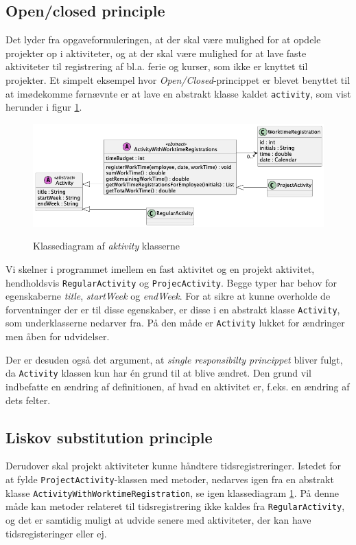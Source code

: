 \subsection{Open/closed principle} \label{sec:solid_o}
Det lyder fra opgaveformuleringen, at der skal være mulighed for at opdele projekter op i aktiviteter, og at der skal være mulighed for at lave faste aktiviteter til registrering af bl.a. ferie og kurser, som ikke er knyttet til projekter. Et simpelt eksempel hvor \textit{Open/Closed}-princippet er blevet benyttet til at imødekomme førnævnte er at lave en abstrakt klasse kaldet \texttt{activity}, som vist herunder i figur \ref{fig:class_activity_example}.

\begin{figure}[H]
    \centering
    \caption{Klassediagram af \textit{aktivity} klasserne}
    \includegraphics[width = 12cm, keepaspectratio]{TaskFusion/out/assets/diagrams/class_liskov_model_example/liskov_model_example.png}
    \label{fig:class_activity_example}
\end{figure}
Vi skelner i programmet imellem en fast aktivitet og en projekt aktivitet, hendholdsvis \texttt{RegularActivity} og \texttt{ProjecActivity}. Begge typer har behov for egenskaberne \textit{title}, \textit{startWeek} og \textit{endWeek}. For at sikre at kunne overholde de forventninger der er til disse egenskaber, er disse i en abstrakt klasse \texttt{Activity}, som underklasserne nedarver fra. På den måde er \texttt{Activity} lukket for ændringer men åben for udvidelser. 

Der er desuden også det argument, at \textit{single responsibilty princippet} bliver fulgt, da \texttt{Activity} klassen kun har én grund til at blive ændret. Den grund vil indbefatte en ændring af definitionen, af hvad en aktivitet er, f.eks. en ændring af dets felter.

\subsection{Liskov substitution principle} \label{sec:solid_l}
Derudover skal projekt aktiviteter kunne håndtere tidsregistreringer. Istedet for at fylde \texttt{ProjectActivity}-klassen med metoder, nedarves igen fra en abstrakt klasse \texttt{ActivityWithWorktimeRegistration}, se igen klassediagram \ref{fig:class_activity_example}. På denne måde kan metoder relateret til tidsregistrering ikke kaldes fra \texttt{RegularActivity}, og det er samtidig muligt at udvide senere med aktiviteter, der kan have tidsregisteringer eller ej.

